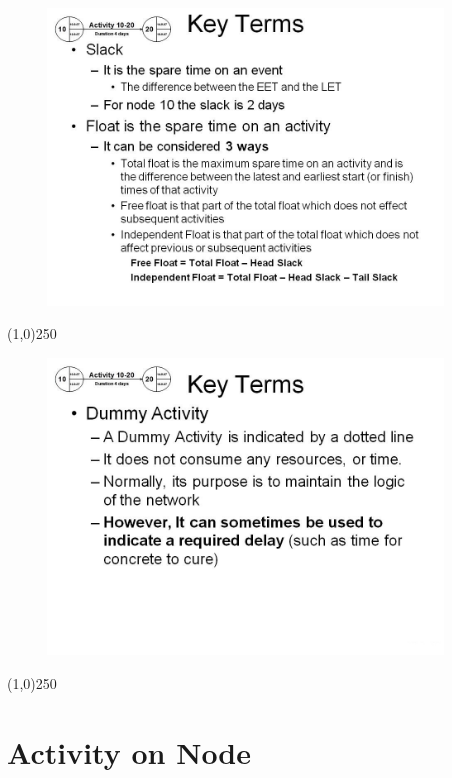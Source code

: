 \begin{frame}
\begin{figure}
	\centering
		\includegraphics[width = 10.5cm]{oldnotes/Slide57.jpg}
\end{figure}
\end{frame}
\begin{center}\line(1,0){250}\end{center}





\begin{frame}
\begin{figure}
	\centering
		\includegraphics[width = 10.5cm]{oldnotes/Slide58.jpg}
\end{figure}
\end{frame}
\begin{center}\line(1,0){250}\end{center}



\section{Activity on Node}

